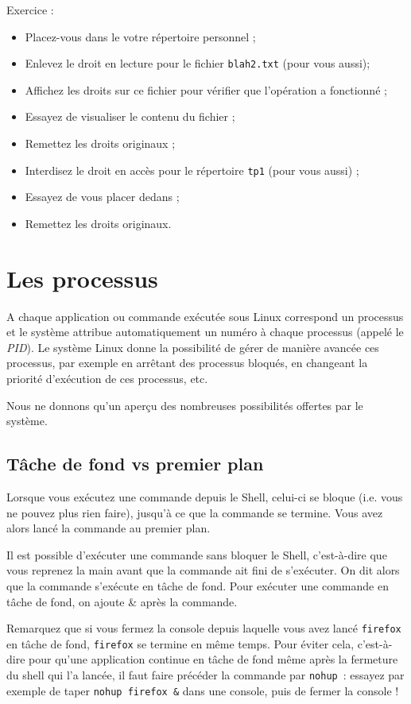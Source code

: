 \documentclass[12pt,a4paper]{article}
\begin{document}
Exercice :
\begin{itemize}
\item Placez-vous dans le votre répertoire personnel ;
\item Enlevez le droit en lecture pour le fichier \texttt{blah2.txt} (pour
  vous aussi);
\item Affichez les droits sur ce fichier pour vérifier que l'opération
  a fonctionné ;
\item Essayez de visualiser le contenu du fichier ;
\item Remettez les droits originaux ;
\item Interdisez le droit en accès pour le répertoire \texttt{tp1} (pour vous
  aussi) ;
\item Essayez de vous placer dedans ;
\item Remettez les droits originaux.
\end{itemize}

\section{Les processus}
A chaque application ou commande exécutée sous Linux correspond un
processus et le système attribue automatiquement un numéro à chaque
processus (appelé le \textit{PID}). Le système Linux donne la possibilité de
gérer de manière avancée ces processus, par exemple en arrêtant des
processus bloqués, en changeant la priorité d'exécution de ces
processus, etc. 

Nous ne donnons qu'un aperçu des nombreuses possibilités offertes par le système.

\subsection{Tâche de fond vs premier plan}
Lorsque vous exécutez une commande depuis le Shell, celui-ci se bloque
(i.e. vous ne pouvez plus rien faire), jusqu'à ce que la commande se
termine. Vous avez alors lancé la commande au premier plan.

Il est possible d'exécuter une commande sans bloquer le Shell,
c'est-à-dire que vous reprenez la main avant que la commande ait fini
de s'exécuter. On dit alors que la commande s'exécute en tâche de
fond. Pour exécuter une commande en tâche de fond, on ajoute \& après
la commande.

Remarquez que si vous fermez la console depuis laquelle vous avez
lancé \texttt{firefox} en tâche de fond, \texttt{firefox} se termine
en même temps. Pour éviter cela, c'est-à-dire pour qu'une application
continue en tâche de fond même après la fermeture du shell qui l'a
lancée, il faut faire précéder la commande par \texttt{nohup}~:
essayez par exemple de taper \texttt{nohup firefox \&} dans une
console, puis de fermer la console !
\end{document}
